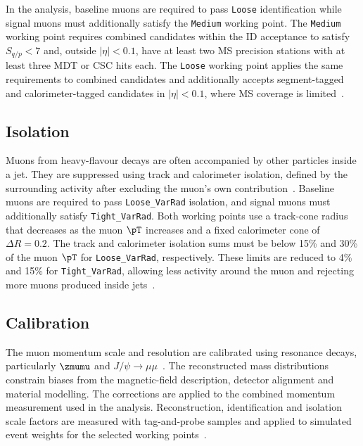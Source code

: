 In the analysis, baseline muons are required to pass \texttt{Loose} identification while signal muons must additionally satisfy the \texttt{Medium} working point.
The \texttt{Medium} working point requires combined candidates within the ID acceptance to satisfy $S_{q/p}<7$ and, outside $|\eta|<0.1$, have at least two MS precision stations with at least three MDT or CSC hits each.
The \texttt{Loose} working point applies the same requirements to combined candidates and additionally accepts segment-tagged and calorimeter-tagged candidates in $|\eta|<0.1$, where MS coverage is limited~\cite{ATLAS2021MuonID}.

\subsection{Isolation}

Muons from heavy-flavour decays are often accompanied by other particles inside a jet.
They are suppressed using track and calorimeter isolation, defined by the surrounding activity after excluding the muon's own contribution~\cite{ATLAS2021MuonID}.
Baseline muons are required to pass \texttt{Loose\_VarRad} isolation, and signal muons must additionally satisfy \texttt{Tight\_VarRad}.
Both working points use a track-cone radius that decreases as the muon $\pT$ increases and a fixed calorimeter cone of $\Delta R=0.2$.
The track and calorimeter isolation sums must be below 15\% and 30\% of the muon $\pT$ for \texttt{Loose\_VarRad}, respectively.
These limits are reduced to 4\% and 15\% for \texttt{Tight\_VarRad}, allowing less activity around the muon and rejecting more muons produced inside jets~\cite{ATLAS2021MuonID}.

\subsection{Calibration}

The muon momentum scale and resolution are calibrated using resonance decays, particularly $\zmumu$ and $J/\psi\rightarrow\mu\mu$~\cite{ATLAS2023MuonCalibration}.
The reconstructed mass distributions constrain biases from the magnetic-field description, detector alignment and material modelling.
The corrections are applied to the combined momentum measurement used in the analysis.
Reconstruction, identification and isolation scale factors are measured with tag-and-probe samples and applied to simulated event weights for the selected working points~\cite{ATLAS2021MuonID}.

